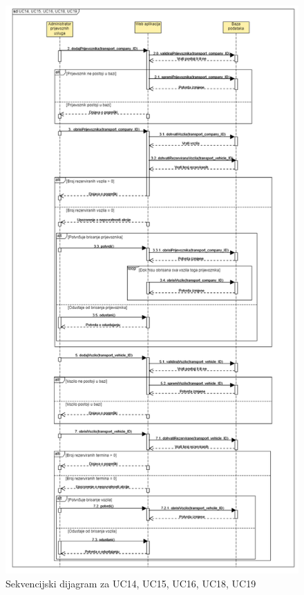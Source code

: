 				\begin{figure}[H]
					\includegraphics[scale=0.48]{slike/sd3.PNG} %
					\centering
					\caption{Sekvencijski dijagram za UC14, UC15, UC16, UC18, UC19}
					\label{fig:sd3} %
				\end{figure}
				
